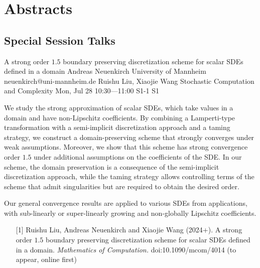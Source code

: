 \chapter{Abstracts}\newpage\section{Special Session Talks}

\begin{talk}
  {A strong order $1.5$ boundary preserving discretization scheme for scalar SDEs defined in a domain}%
  {Andreas Neuenkirch}%
  {University of Mannheim}%
  {neuenkirch@uni-mannheim.de}%
  {Ruishu Liu, Xiaojie Wang}%
  {Stochastic Computation and Complexity}%
  {Mon, Jul 28 10:30---11:00}%
  {S1-1}%
  {S1}%
    
   
We study the strong approximation of scalar SDEs, which take values in a domain and have non-Lipschitz coefficients.
By combining a Lamperti-type transformation with a semi-implicit discretization approach and a taming 
strategy,  we construct a domain-preserving scheme that strongly converges under weak assumptions. 
Moreover,
we show that this scheme has strong convergence order $1.5$ under additional assumptions on the coefficients of the SDE. In our scheme, the domain preservation is a consequence of the semi-implicit discretization approach, while the taming strategy allows controlling terms of the scheme that admit singularities but are required to obtain the desired order.

Our general convergence results  are  applied to various SDEs from applications, with sub-linearly or super-linearly growing and non-globally Lipschitz coefficients.


\medskip

\begin{enumerate}
 \item[{[1]}]  Ruishu Liu, Andreas Neuenkirch and Xiaojie Wang (2024+). A strong order $1.5$
 boundary preserving discretization scheme for scalar SDEs defined in a domain. {\it Mathematics of Computation.} doi:10.1090/mcom/4014 (to appear, online first)
\end{enumerate}

\end{talk}

